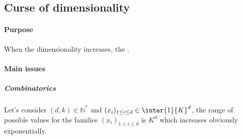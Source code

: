 \subsection{Curse of dimensionality}
\paragraph{Purpose}
When the dimensionality increases, the .
\paragraph{Main issues}
\subparagraph{Combinatorics}
Let's consider $(d,k)\in\mathbb{N}^{*}$ and $(x_{i})_{1\leq i\leq d} \in\inter{1}{K}^{d}$, the
range of possible values for the families $(x_{i})_{1\leq i\leq d}$ is $K^{d}$  which increases 
obviously exponentially.



